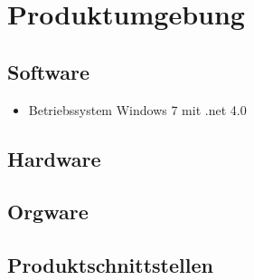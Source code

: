 \chapter{Produktumgebung}

\section{Software}
\begin{itemize}
\item Betriebssystem Windows 7 mit .net 4.0
\end{itemize}
\section{Hardware}

\section{Orgware}

\section{Produktschnittstellen}